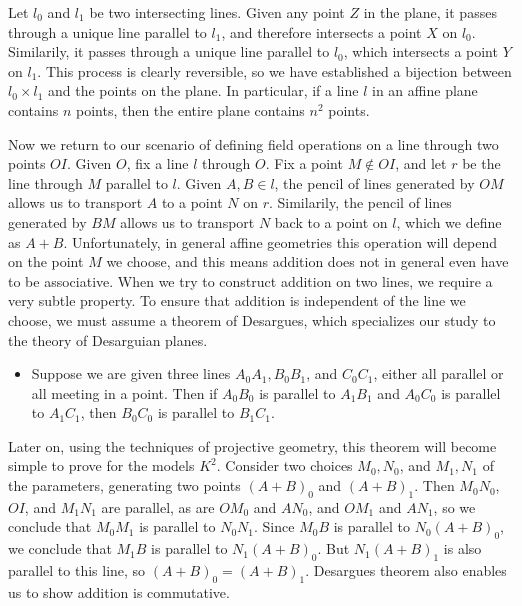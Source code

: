 \begin{example}
    Let $l_0$ and $l_1$ be two intersecting lines. Given any point $Z$ in the plane, it passes through a unique line parallel to $l_1$, and therefore intersects a point $X$ on $l_0$. Similarily, it passes through a unique line parallel to $l_0$, which intersects a point $Y$ on $l_1$. This process is clearly reversible, so we have established a bijection between $l_0 \times l_1$ and the points on the plane. In particular, if a line $l$ in an affine plane contains $n$ points, then the entire plane contains $n^2$ points.
\end{example}

Now we return to our scenario of defining field operations on a line through two points $OI$. Given $O$, fix a line $l$ through $O$. Fix a point $M \not \in OI$, and let $r$ be the line through $M$ parallel to $l$. Given $A,B \in l$, the pencil of lines generated by $OM$ allows us to transport $A$ to a point $N$ on $r$. Similarily, the pencil of lines generated by $BM$ allows us to transport $N$ back to a point on $l$, which we define as $A + B$. Unfortunately, in general affine geometries this operation will depend on the point $M$ we choose, and this means addition does not in general even have to be associative. When we try to construct addition on two lines, we require a very subtle property. To ensure that addition is independent of the line we choose, we must assume a theorem of Desargues, which specializes our study to the theory of Desarguian planes.
%
\begin{itemize}
    \item Suppose we are given three lines $A_0A_1, B_0B_1$, and $C_0C_1$, either all parallel or all meeting in a point. Then if $A_0B_0$ is parallel to $A_1B_1$ and $A_0C_0$ is parallel to $A_1C_1$, then $B_0C_0$ is parallel to $B_1C_1$.
\end{itemize}
%
Later on, using the techniques of projective geometry, this theorem will become simple to prove for the models $K^2$. Consider two choices $M_0,N_0$, and $M_1,N_1$ of the parameters, generating two points $(A+B)_0$ and $(A+B)_1$. Then $M_0N_0$, $OI$, and $M_1N_1$ are parallel, as are $OM_0$ and $AN_0$, and $OM_1$ and $AN_1$, so we conclude that $M_0M_1$ is parallel to $N_0N_1$. Since $M_0B$ is parallel to $N_0(A+B)_0$, we conclude that $M_1B$ is parallel to $N_1(A+B)_0$. But $N_1(A+B)_1$ is also parallel to this line, so $(A+B)_0 = (A+B)_1$. Desargues theorem also enables us to show addition is commutative.

